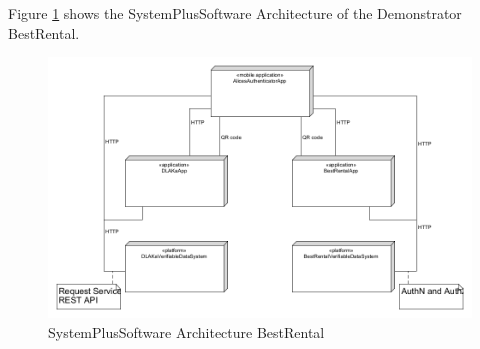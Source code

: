 Figure \ref{fig:sps_architecture_bestrental} shows the SystemPlusSoftware Architecture of the Demonstrator BestRental.

\begin{figure}
	\centering
	\includegraphics[width=\textwidth]{figures/sps_BestRentalPOC.png}
	\caption{SystemPlusSoftware Architecture BestRental}
	\label{fig:sps_architecture_bestrental}
\end{figure}